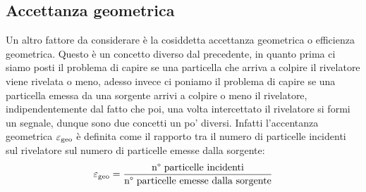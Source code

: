   \subsection{Accettanza geometrica}
  Un altro fattore da considerare è la cosiddetta accettanza geometrica o efficienza geometrica. Questo è un concetto diverso dal precedente, in quanto prima ci siamo posti il problema di capire se una particella che arriva a colpire il rivelatore viene rivelata o meno, adesso invece ci poniamo il problema di capire se una particella emessa da una sorgente arrivi a colpire o meno il rivelatore, indipendentemente dal fatto che poi, una volta intercettato il rivelatore si formi un segnale, dunque sono due concetti un po' diversi. Infatti l'accentanza geometrica $\varepsilon_{\rm geo}$ è definita come il rapporto tra il numero di particelle incidenti sul rivelatore sul numero di particelle emesse dalla sorgente:
  \begin{equation*}
   \varepsilon_{\rm geo}
   =\frac{\text{n° particelle incidenti}}{\text{n° particelle emesse dalla sorgente}}
  \end{equation*}
